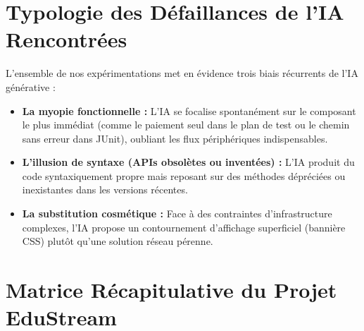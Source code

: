 \documentclass[11pt, a4paper, openany]{report}
\begin{document}
\section{Typologie des Défaillances de l'IA Rencontrées}
L'ensemble de nos expérimentations met en évidence trois biais récurrents de l'IA générative :
\begin{itemize}[label=\textbullet, itemsep=2pt]
    \item \textbf{La myopie fonctionnelle :} L'IA se focalise spontanément sur le composant le plus immédiat (comme le paiement seul dans le plan de test ou le chemin sans erreur dans JUnit), oubliant les flux périphériques indispensables.
    \item \textbf{L'illusion de syntaxe (APIs obsolètes ou inventées) :} L'IA produit du code syntaxiquement propre mais reposant sur des méthodes dépréciées ou inexistantes dans les versions récentes.
    \item \textbf{La substitution cosmétique :} Face à des contraintes d'infrastructure complexes, l'IA propose un contournement d'affichage superficiel (bannière CSS) plutôt qu'une solution réseau pérenne.
\end{itemize}

\section{Matrice Récapitulative du Projet EduStream}
\end{document}
